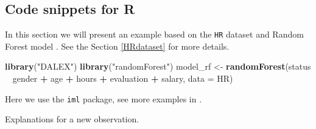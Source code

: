 \documentclass[]{krantz}
\newenvironment{Shaded}{\begin{snugshade}}{\end{snugshade}}
\newcommand{\DataTypeTok}[1]{\textcolor[rgb]{0.13,0.29,0.53}{#1}}
\newcommand{\DecValTok}[1]{\textcolor[rgb]{0.00,0.00,0.81}{#1}}
\newcommand{\FloatTok}[1]{\textcolor[rgb]{0.00,0.00,0.81}{#1}}
\newcommand{\KeywordTok}[1]{\textcolor[rgb]{0.13,0.29,0.53}{\textbf{#1}}}
\newcommand{\NormalTok}[1]{#1}
\newcommand{\OperatorTok}[1]{\textcolor[rgb]{0.81,0.36,0.00}{\textbf{#1}}}
\newcommand{\StringTok}[1]{\textcolor[rgb]{0.31,0.60,0.02}{#1}}
\theoremstyle{definition}
\theoremstyle{definition}
\theoremstyle{definition}
\theoremstyle{remark}
\begin{document}
\hypertarget{code-snippets-for-r-2}{%
\subsection{Code snippets for R}\label{code-snippets-for-r-2}}

In this section we will present an example based on the \texttt{HR}
dataset and Random Forest model \citep{R-randomForest}. See the Section
\ref{HRdataset} for more details.

\begin{Shaded}
\begin{Highlighting}[]
\KeywordTok{library}\NormalTok{(}\StringTok{"DALEX"}\NormalTok{)}
\KeywordTok{library}\NormalTok{(}\StringTok{"randomForest"}\NormalTok{)}
\NormalTok{model_rf <-}\StringTok{ }\KeywordTok{randomForest}\NormalTok{(status }\OperatorTok{~}\StringTok{ }\NormalTok{gender }\OperatorTok{+}\StringTok{ }\NormalTok{age }\OperatorTok{+}\StringTok{ }\NormalTok{hours }\OperatorTok{+}\StringTok{ }\NormalTok{evaluation }\OperatorTok{+}\StringTok{ }\NormalTok{salary, }\DataTypeTok{data =}\NormalTok{ HR)}
\end{Highlighting}
\end{Shaded}

Here we use the \texttt{iml} package, see more examples in
\citep{imlPackage}.

\begin{Shaded}
\end{Shaded}

Explanations for a new observation.

\begin{Shaded}
\end{Shaded}
\end{document}
